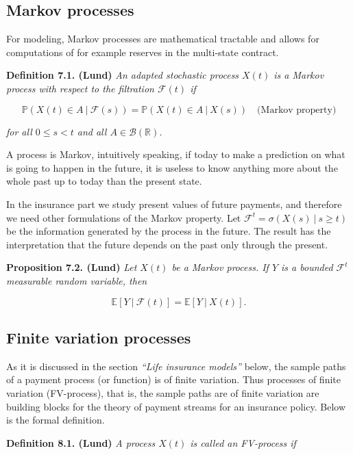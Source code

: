 \documentclass[a4paper,10pt,openany]{book}
\begin{document}
\hypertarget{markov-processes}{%
\subsection{Markov processes}\label{markov-processes}}

For modeling, Markov processes are mathematical tractable and allows for computations of for example reserves in the multi-state contract.

\textbf{Definition 7.1. (Lund)} \emph{An adapted stochastic process \(X(t)\) is a Markov process with respect to the filtration \(\mathcal F(t)\) if}

\[
\mathbb P(X(t)\in A\ \vert\ \mathcal F(s))=\mathbb P(X(t)\in A\ \vert\ X(s))\quad \text{(Markov property)}
\]

\emph{for all \(0\le s< t\) and all \(A\in\mathcal B(\mathbb R)\).}

A process is Markov, intuitively speaking, if today to make a prediction on what is going to happen in the future, it is useless to know anything more about the whole past up to today than the present state.

In the insurance part we study present values of future payments, and therefore we need other formulations of the Markov property. Let \(\mathcal F^t = \sigma(X(s)\ \vert\ s \ge t)\) be the information generated by the process in the future. The result has the interpretation that the future depends on the past only through the present.

\textbf{Proposition 7.2. (Lund)} \emph{Let \(X(t)\) be a Markov process. If \(Y\) is a bounded \(\mathcal F^t\) measurable random variable, then}

\[
\mathbb E[Y\ \vert\ \mathcal F(t)]=\mathbb E[Y\ \vert\ X(t)].
\]

\hypertarget{finite-variation-processes}{%
\subsection{Finite variation processes}\label{finite-variation-processes}}

As it is discussed in the section \emph{``Life insurance models''} below, the sample paths of a payment process (or function) is of finite variation. Thus processes of finite variation (FV-process), that is, the sample paths are of finite variation are building blocks for the theory of payment streams for an insurance policy. Below is the formal definition.

\textbf{Definition 8.1. (Lund)} \emph{A process \(X(t)\) is called an FV-process if}
\end{document}
